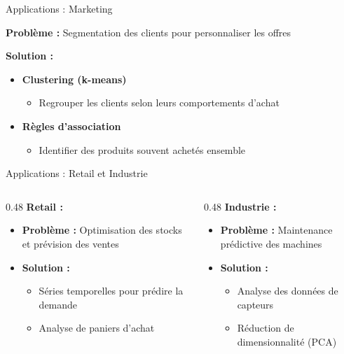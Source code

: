 \begin{frame}{Applications : Marketing}

\textbf{Problème :} Segmentation des clients pour personnaliser les offres

\vspace{0.3cm}

\textbf{Solution :}
\begin{itemize}
    \item<+-> \textbf{Clustering (k-means)}
        \begin{itemize}
            \item Regrouper les clients selon leurs comportements d'achat
        \end{itemize}

    \vspace{0.2cm}
    \item<+-> \textbf{Règles d'association}
        \begin{itemize}
            \item Identifier des produits souvent achetés ensemble
        \end{itemize}
\end{itemize}

\end{frame}

\begin{frame}{Applications : Retail et Industrie}

\begin{columns}
\begin{column}{0.48\textwidth}
    \textbf{Retail :}
    \begin{itemize}
        \item \textbf{Problème :} Optimisation des stocks et prévision des ventes
        \item \textbf{Solution :}
        \begin{itemize}
            \item Séries temporelles pour prédire la demande
            \item Analyse de paniers d'achat
        \end{itemize}
    \end{itemize}
\end{column}

\begin{column}{0.48\textwidth}
    \textbf{Industrie :}
    \begin{itemize}
        \item \textbf{Problème :} Maintenance prédictive des machines
        \item \textbf{Solution :}
        \begin{itemize}
            \item Analyse des données de capteurs
            \item Réduction de dimensionnalité (PCA)
        \end{itemize}
    \end{itemize}
\end{column}
\end{columns}

\end{frame}

